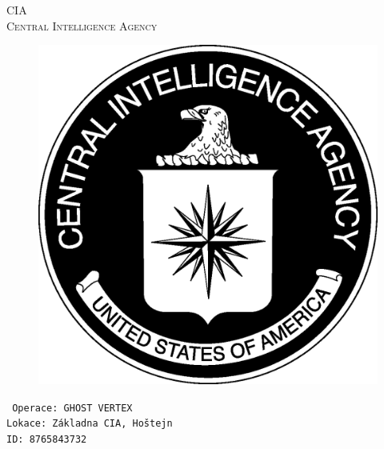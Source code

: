 \documentclass[a4paper, \fontheight]{article}
\begin{document}
	\begin{titlepage}
		\begin{center}		
			\textsc{{\fontsize{80}{0}\selectfont CIA}\\[2em]
				\Huge Central Intelligence Agency\\[2.5em]}
				
			\begin{figure}[H]
				\centering
				\includegraphics[scale=0.6]{sources/CIA_logo.eps}
			\end{figure}
		\end{center}	
		\vfill
		\noindent
		\texttt{\LARGE
				Operace: GHOST VERTEX\\[0.4em]
				Lokace: Základna CIA, Hoštejn\\[0.4em]
				ID: 8765843732}	
\end{titlepage} 
\end{document}

